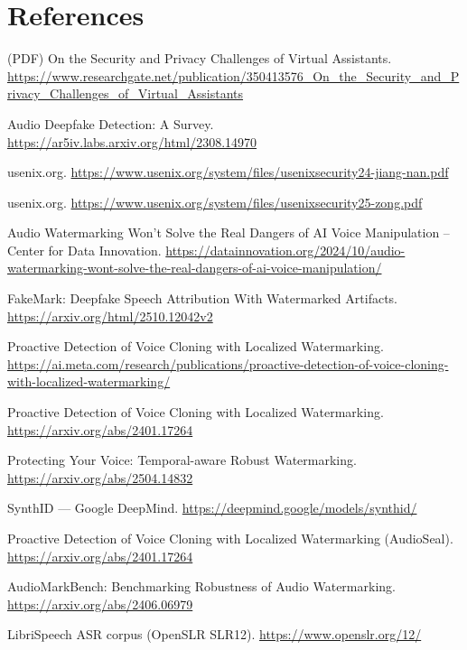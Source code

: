 \section*{References}
\small
\noindent [1] [15] (PDF) On the Security and Privacy Challenges of Virtual Assistants. \url{https://www.researchgate.net/publication/350413576_On_the_Security_and_Privacy_Challenges_of_Virtual_Assistants}\par
\noindent [2] [6] [7] [8] [13] [17] [18] [38] [39] [40] [41] [42] [43] [44] [45] [48] [2308.14970] Audio Deepfake Detection: A Survey. \url{https://ar5iv.labs.arxiv.org/html/2308.14970}\par
\noindent [3] [16] usenix.org. \url{https://www.usenix.org/system/files/usenixsecurity24-jiang-nan.pdf}\par
\noindent [4] [5] [12] [23] [24] [29] [30] [31] [49] usenix.org. \url{https://www.usenix.org/system/files/usenixsecurity25-zong.pdf}\par
\noindent [9] [11] [19] [20] [21] [22] Audio Watermarking Won't Solve the Real Dangers of AI Voice Manipulation -- Center for Data Innovation. \url{https://datainnovation.org/2024/10/audio-watermarking-wont-solve-the-real-dangers-of-ai-voice-manipulation/}\par
\noindent [10] [28] [35] [36] [37] [46] [47] [50] [51] [52] [53] [54] FakeMark: Deepfake Speech Attribution With Watermarked Artifacts. \url{https://arxiv.org/html/2510.12042v2}\par
\noindent [14] Proactive Detection of Voice Cloning with Localized Watermarking. \url{https://ai.meta.com/research/publications/proactive-detection-of-voice-cloning-with-localized-watermarking/}\par
\noindent [25] [26] [27] [2401.17264] Proactive Detection of Voice Cloning with Localized Watermarking. \url{https://arxiv.org/abs/2401.17264}\par
\noindent [32] [33] [34] [2504.14832] Protecting Your Voice: Temporal-aware Robust Watermarking. \url{https://arxiv.org/abs/2504.14832}\par
\noindent [55] SynthID --- Google DeepMind. \url{https://deepmind.google/models/synthid/}\par
\noindent [56] Proactive Detection of Voice Cloning with Localized Watermarking (AudioSeal). \url{https://arxiv.org/abs/2401.17264}\par
\noindent [57] AudioMarkBench: Benchmarking Robustness of Audio Watermarking. \url{https://arxiv.org/abs/2406.06979}\par
\noindent [58] LibriSpeech ASR corpus (OpenSLR SLR12). \url{https://www.openslr.org/12/}\par

